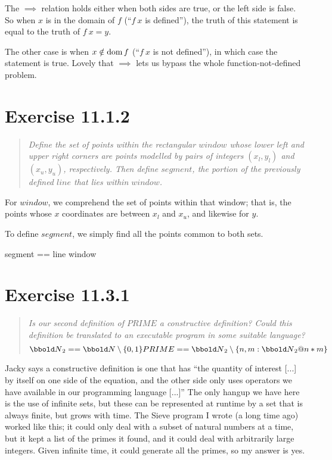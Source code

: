 \documentclass[10pt]{article}
\begin{document}
The $\implies$ relation holds either when both sides are true, or the left side is false.  So when
$x$ is in the domain of $f$ (``$f\ x$ is defined''), the truth of this statement is equal to the
truth of $f\ x = y$.

The other case is when $x \notin \mathop{\mathrm{dom}} f$ (``$f\ x$ is not defined''), in which case the statement is
true.  Lovely that $\implies$ lets us bypass the whole function-not-defined problem.



\section{Exercise 11.1.2}
\begin{quote}
  {\it Define the set of points within the rectangular $window$ whose lower left and upper right
    corners are points modelled by pairs of integers $(x_l, y_l)$ and $(x_u, y_u)$, respectively.
    Then define $segment$, the portion of the previously defined $line$ that lies within $window$.
  }
\end{quote}

For $window$, we comprehend the set of points within that window; that is, the points whose $x$
coordinates are between $x_l$ and $x_u$, and likewise for $y$.

To define $segment$, we simply find all the points common to both sets.

\begin{syntax}
  segment == line \cap window
\end{syntax}



\section{Exercise 11.3.1}
\begin{quote}
  {\it Is our second definition of $PRIME$ a constructive definition?  Could this definition be
    translated to an executable program in some suitable language? 
  \[ \nat_2 == \nat \setminus \{ 0,1 \} \\
  PRIME == \nat_2 \setminus \{n,m : \nat_2 @ n*m\}\] }
\end{quote}

Jacky says a constructive definition is one that has ``the quantity of interest [...] by itself on
one side of the equation, and the other side only uses operators we have available in our
programming language [...]''  The only hangup we have here is the use of infinite sets, but these
can be represented at runtime by a set that is always finite, but grows with time.  The Sieve
program I wrote (a long time ago) worked like this; it could only deal with a subset of natural
numbers at a time, but it kept a list of the primes it found, and it could deal with arbitrarily
large integers.  Given infinite time, it could generate all the primes, so my answer is yes.
\end{document}
